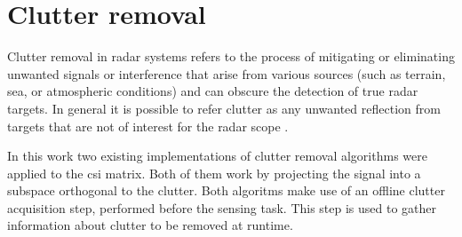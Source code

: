 \section{Clutter removal}
\label{sec:clutter_removal}

	Clutter removal in radar systems refers to the process of mitigating or eliminating unwanted signals or interference that arise from various sources (such as terrain, sea, or atmospheric conditions) and can obscure the detection of true radar targets.
	In general it is possible to refer clutter as any unwanted reflection from targets that are not of interest for the radar scope \cite{Richards_Scheer_Holm_2010}.
	
	In this work two existing implementations of clutter removal algorithms were applied to the \gls{csi} matrix.
	Both of them work by projecting the signal into a subspace orthogonal to the clutter.
	Both algoritms make use of an offline clutter acquisition step, performed before the sensing task. This step is used to gather information about clutter to be removed at runtime.
